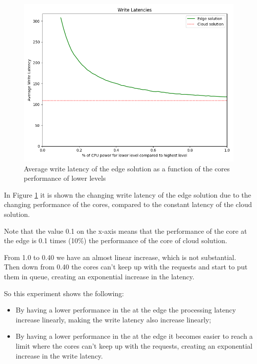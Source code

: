 \begin{figure}[H]
    \centering
    \includegraphics[width=0.95\linewidth]{Figures/Evaluation/write-all-cpu-latency.png}
    \caption{Average write latency of the edge solution as a function of the cores performance of lower levels}
    \label{fig:/write-all-cpu-latency}
\end{figure}

In Figure \ref{fig:/write-all-cpu-latency} it is shown the changing write latency of the edge solution due to the changing performance of the  cores, compared to the constant latency of the cloud solution.

Note that the value 0.1 on the x-axis means that the performance of the core at the edge is 0.1 times (10\%) the performance of the core of cloud solution.

From 1.0 to 0.40 we have an almost linear increase, which is not substantial. Then down from 0.40 the cores can't keep up with the requests and start to put them in queue, creating an exponential increase in the latency.

So this experiment shows the following:
\begin{itemize}
    \item By having a lower performance in the  at the edge the processing latency increase linearly, making the write latency also increase linearly;
    \item By having a lower performance in the  at the edge it becomes easier to reach a limit where the cores can't keep up with the requests, creating an exponential increase in the write latency.
\end{itemize}


